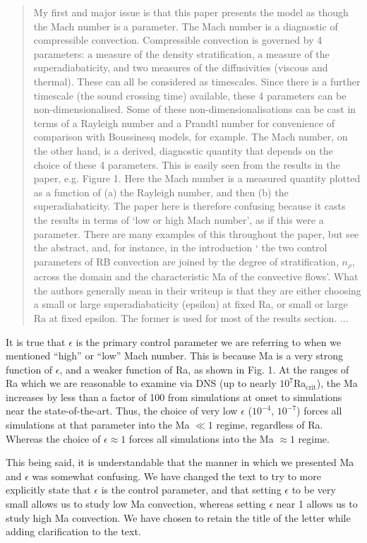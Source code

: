 \documentclass[aps, 11pt, singlecolumn]{revtex4-1} %
\begin{document}
\begin{singlespace}
\begin{quotation}
My first and major issue is that this paper presents the model as
though the Mach number is a parameter. The Mach number is a diagnostic
of compressible convection. Compressible convection is governed by 4
parameters: a measure of the density stratification, a measure of the
superadiabaticity, and two measures of the diffusivities (viscous and
thermal). These can all be considered as timescales. Since there is a
further timescale (the sound crossing time) available, these 4
parameters can be non-dimensionalised. Some of these
non-dimensionalisations can be cast in terms of a Rayleigh number and
a Prandtl number for convenience of comparison with Boussinesq models,
for example. The Mach number, on the other hand, is a derived,
diagnostic quantity that depends on the choice of these 4 parameters.
This is easily seen from the results in the paper, e.g. Figure 1. Here
the Mach number is a measured quantity plotted as a function of (a)
the Rayleigh number, and then (b) the superadiabaticity. The paper
here is therefore confusing because it casts the results in terms of
`low or high Mach number', as if this were a parameter. There
are many examples of this throughout the paper, but see the abstract,
and, for instance, in the introduction ` the two control parameters
of RB convection are joined by the degree of stratification, $n_\rho$,
across the domain and the characteristic Ma of the convective
flows'. What the authors generally mean in their writeup is that
they are either choosing a small or large superadiabaticity (epsilon)
at fixed Ra, or small or large Ra at fixed epsilon. The former is used
for most of the results section.  ...
\end{quotation}
It is true that $\epsilon$ is the primary control parameter we are
referring to when we mentioned ``high'' or ``low'' Mach number. This
is because Ma is a very strong function of $\epsilon$, and a weaker
function of Ra, as shown in Fig. 1.  At the ranges of Ra which we are
reasonable to examine via DNS (up to nearly $10^7$Ra$_{\text{crit}}$),
the Ma increases by less than a factor of 100 from simulations at
onset to simulations near the state-of-the-art.  Thus, the choice of
very low $\epsilon$ ($10^{-4}$, $10^{-7}$) forces all simulations at
that parameter into the Ma $\ll 1$ regime, regardless of Ra.  Whereas the
choice of $\epsilon \approx 1$ forces all simulations into the Ma $\approx 1$
regime.

This being said, it is understandable that the manner in which we presented
Ma and $\epsilon$ was somewhat confusing.  We have changed the text to try
to more explicitly state that $\epsilon$ is the control parameter, and that
setting $\epsilon$ to be very small allows us to study low Ma convection,
whereas setting $\epsilon$ near 1 allows us to study high Ma convection.  We
have chosen to retain the title of the letter while adding clarification to
the text.


\end{singlespace}
\end{document}
